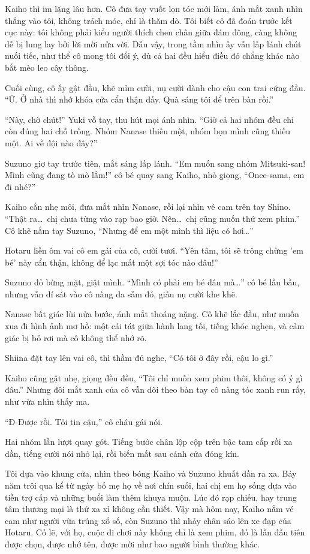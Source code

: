 \documentclass[../main.tex]{subfiles}
\begin{document}
Kaiho thì im lặng lâu hơn. Cô đưa tay vuốt lọn tóc mới làm, ánh mắt xanh nhìn thẳng vào tôi, không trách móc, chỉ là thăm dò. Tôi biết cô đã đoán trước kết cục này: tôi không phải kiểu người thích chen chân giữa đám đông, càng không dễ bị lung lay bởi lời mời nửa vời. Dẫu vậy, trong tầm nhìn ấy vẫn lấp lánh chút nuối tiếc, như thể cô mong tôi đổi ý, dù cả hai đều hiểu điều đó chẳng khác nào bắt mèo leo cây thông.

Cuối cùng, cô ấy gật đầu, khẽ mỉm cười, nụ cười dành cho cậu con trai cứng đầu. ``Ừ. Ở nhà thì nhớ khóa cửa cẩn thận đấy. Quà sáng tôi để trên bàn rồi.''

``Này, chờ chút!'' Yuki vỗ tay, thu hút mọi ánh nhìn. ``Giờ cả hai nhóm đều chỉ còn đúng hai chỗ trống. Nhóm Nanase thiếu một, nhóm bọn mình cũng thiếu một. Ai về đội nào đây?''

Suzuno giơ tay trước tiên, mắt sáng lấp lánh. ``Em muốn sang nhóm Mitsuki-san! Mình cũng đang tò mò lắm!'' cô bé quay sang Kaiho, nhỏ giọng, ``Onee-sama, em đi nhé?''

Kaiho cắn nhẹ môi, đưa mắt nhìn Nanase, rồi lại nhìn vé cam trên tay Shino. ``Thật ra\dots\ chị chưa từng vào rạp bao giờ. Nên\dots\ chị cũng muốn thử xem phim.'' Cô khẽ nắm tay Suzuno, ``Nhưng để em một mình thì liệu có hơi\dots''

Hotaru liền ôm vai cô em gái của cô, cười tươi. ``Yên tâm, tôi sẽ trông chừng 'em bé' này cẩn thận, không để lạc mất một sợi tóc nào đâu!''

Suzuno đỏ bừng mặt, giật mình. ``Mình có phải em bé đâu mà\dots'' cô bé lầu bầu, nhưng vẫn dí sát vào cô nàng da sẫm đó, giấu nụ cười khe khẽ.

Nanase bất giác lùi nửa bước, ánh mắt thoáng nặng. Cô khẽ lắc đầu, như muốn xua đi hình ảnh mơ hồ: một cái tát giữa hành lang tối, tiếng khóc nghẹn, và cảm giác bị bỏ rơi mà cô không thể nhớ rõ.

Shiina đặt tay lên vai cô, thì thầm đủ nghe, ``Có tôi ở đây rồi, cậu lo gì.''

Kaiho cũng gật nhẹ, giọng đều đều, ``Tôi chỉ muốn xem phim thôi, không có ý gì đâu.'' Nhưng đôi mắt xanh của cô vẫn dõi theo bàn tay cô nàng tóc xanh run rẩy, như vừa nhìn thấy ma.

``Đ-Được rồi. Tôi tin cậu,'' cô cháu gái nói.

Hai nhóm lần lượt quay gót. Tiếng bước chân lộp cộp trên bậc tam cấp rồi xa dần, tiếng cười nói nhỏ lại, rồi biến mất sau cánh cửa đóng kín.

Tôi dựa vào khung cửa, nhìn theo bóng Kaiho và Suzuno khuất dần ra xa. Bảy năm trôi qua kể từ ngày bố mẹ họ về nơi chín suối, hai chị em họ sống dựa vào tiền trợ cấp và những buổi làm thêm khuya muộn. Lúc đó rạp chiếu, hay trung tâm thương mại là thứ xa xỉ không cần thiết. Vậy mà hôm nay, Kaiho nắm vé cam như người vừa trúng xổ số, còn Suzuno thì nhảy chân sáo lên xe đạp của Hotaru. Có lẽ, với họ, cuộc đi chơi này không chỉ là xem phim, đó là lần đầu tiên được chọn, được nhớ tên, được mời như bao người bình thường khác.
\end{document}
